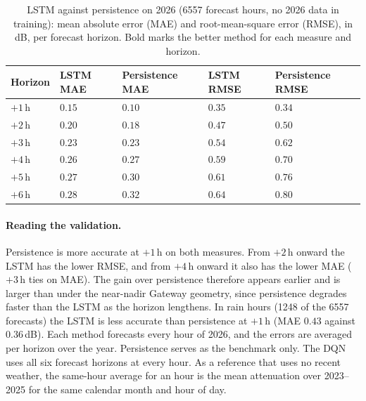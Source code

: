 \documentclass[conference]{IEEEtran}
\begin{document}
\begin{table}[t]
\centering
\caption{LSTM against persistence on 2026 (6557 forecast hours, no 2026 data in training): mean absolute error (MAE) and root-mean-square error (RMSE), in dB, per forecast horizon. Bold marks the better method for each measure and horizon.}
\label{tab:lstm-2026}
{\scriptsize\setlength{\tabcolsep}{3pt}
\begin{tabularx}{\columnwidth}{|>{\centering\arraybackslash}X|>{\centering\arraybackslash}X|>{\centering\arraybackslash}X|>{\centering\arraybackslash}X|>{\centering\arraybackslash}X|}
\hline
\textbf{Horizon} & \textbf{LSTM MAE} & \textbf{Persistence MAE} & \textbf{LSTM RMSE} & \textbf{Persistence RMSE} \\
\hline
$+1$\,h & $0.15$ & $\mathbf{0.10}$ & $0.35$ & $\mathbf{0.34}$ \\
\hline
$+2$\,h & $0.20$ & $\mathbf{0.18}$ & $\mathbf{0.47}$ & $0.50$ \\
\hline
$+3$\,h & $0.23$ & $0.23$ & $\mathbf{0.54}$ & $0.62$ \\
\hline
$+4$\,h & $\mathbf{0.26}$ & $0.27$ & $\mathbf{0.59}$ & $0.70$ \\
\hline
$+5$\,h & $\mathbf{0.27}$ & $0.30$ & $\mathbf{0.61}$ & $0.76$ \\
\hline
$+6$\,h & $\mathbf{0.28}$ & $0.32$ & $\mathbf{0.64}$ & $0.80$ \\
\hline
\end{tabularx}}
\end{table}

\paragraph{Reading the validation.} Persistence is more accurate at $+1$\,h on both measures. From $+2$\,h onward the LSTM has the lower RMSE, and from $+4$\,h onward it also has the lower MAE ($+3$\,h ties on MAE). The gain over persistence therefore appears earlier and is larger than under the near-nadir Gateway geometry, since persistence degrades faster than the LSTM as the horizon lengthens. In rain hours (1248 of the 6557 forecasts) the LSTM is less accurate than persistence at $+1$\,h (MAE $0.43$ against $0.36$\,dB). Each method forecasts every hour of 2026, and the errors are averaged per horizon over the year. Persistence serves as the benchmark only. The DQN uses all six forecast horizons at every hour. As a reference that uses no recent weather, the same-hour average for an hour is the mean attenuation over 2023--2025 for the same calendar month and hour of day.
\end{document}
